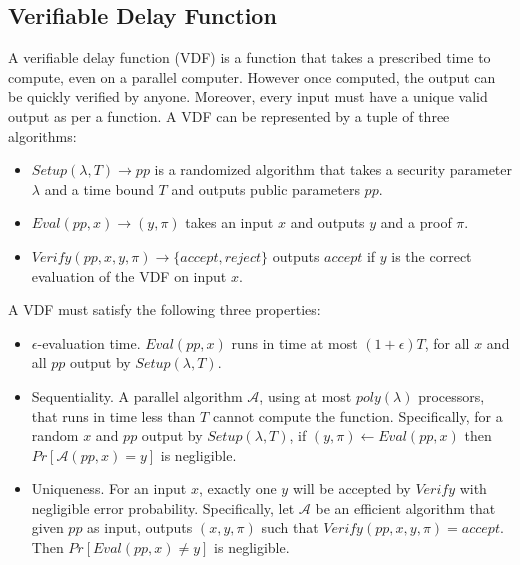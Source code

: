 \documentclass[letterpaper,twocolumn,10pt]{article}
\theoremstyle{definition}
\theoremstyle{remark}
\begin{document}

\subsection{Verifiable Delay Function}
A verifiable delay function (VDF) is a function that takes a prescribed time to compute, even on a parallel computer. However once computed, the output can be quickly verified by anyone. Moreover, every input must have a unique valid output as per a function. A VDF can be represented by a tuple of three algorithms:
\begin{itemize}
\item $Setup(\lambda, T) \rightarrow pp$ is a randomized algorithm that takes a security parameter $\lambda$ and a time bound $T$ and outputs public parameters $pp$.
\item $Eval(pp, x) \rightarrow (y, \pi)$ takes an input $x$ and outputs $y$ and a proof $\pi$.
\item $Verify(pp, x, y, \pi) \rightarrow \{accept, reject\}$ outputs $accept$ if $y$ is the correct evaluation of the VDF on input $x$.
\end{itemize}

A VDF must satisfy the following three properties:
\begin{itemize}
\item $\epsilon$-evaluation time. $Eval(pp, x)$ runs in time at most $(1 + \epsilon) T$, for all $x$ and all $pp$ output by $Setup(\lambda, T)$.
\item Sequentiality. A parallel algorithm $\mathcal{A}$, using at most $poly(\lambda)$ processors, that runs in time less than $T$ cannot compute the function. Specifically, for a random $x$ and $pp$ output by $Setup(\lambda, T)$, if $(y, \pi) \leftarrow Eval(pp, x)$ then $Pr[\mathcal{A}(pp, x) = y]$ is negligible.
\item Uniqueness. For an input $x$, exactly one $y$ will be accepted by $Verify$ with negligible error probability. Specifically, let $\mathcal{A}$ be an efficient algorithm that given $pp$ as input, outputs $(x, y, \pi)$ such that $Verify(pp, x, y, \pi) = accept$. Then $Pr[Eval(pp, x) \neq y]$ is negligible.
\end{itemize}
\end{document}
